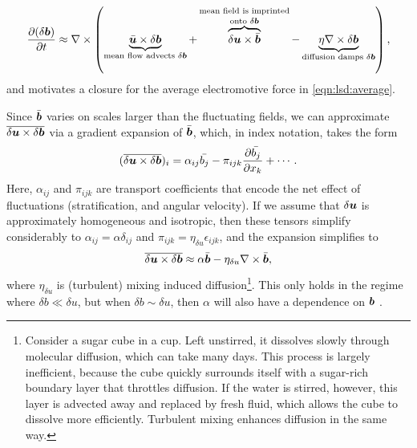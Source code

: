 \begin{align}
    \mppFrac{(\delta\mVector{b})}{t}
        \approx \mCurl{\rbrac{
            \underbrace{
                \bar{\mVector{u}}\times\delta\mVector{b}
            }_\text{mean flow advects $\delta\mVector{b}$}
            + \overbrace{
                \delta\mVector{u}\times\bar{\mVector{b}}
            }^\text{\shortstack{mean field is imprinted\\ onto $\delta\mVector{b}$}}
            - \underbrace{
                \eta \mCurl{\delta\mVector{b}}
            }_\text{diffusion damps $\delta\mVector{b}$}
        }}
    , \label{eqn:lsd:delta:reduced}
\end{align}
and motivates a closure for the average electromotive force in \autoref{eqn:lsd:average}.

Since $\bar{\bm{b}}$ varies on scales larger than the fluctuating fields, we can approximate $\overline{\delta\bm{u} \times \delta\bm{b}}$ via a gradient expansion of $\bar{\bm{b}}$, which, in index notation, takes the form
\begin{align}
    (\overline{\delta\bm{u} \times \delta\bm{b}})_{i}
        = \alpha_{ij} \bar{b_j} - \pi_{ijk} \frac{\partial \bar{b_j}}{\partial x_k} + \cdots
    .
\end{align}
Here, $\alpha_{ij}$ and $\pi_{ijk}$ are transport coefficients that encode the net effect of fluctuations (\eg stratification, and angular velocity). If we assume that $\delta\bm{u}$ is approximately homogeneous and isotropic, then these tensors simplify considerably to $\alpha_{ij} = \alpha \delta_{ij}$ and $\pi_{ijk} = \eta_{\delta u} \epsilon_{ijk}$, and the expansion simplifies to
\begin{align}
    \overline{\delta\bm{u} \times \delta\bm{b}}
        \approx \alpha \bar{\bm{b}} - \eta_{\delta u} \nabla \times \bar{\bm{b}}
    ,
\end{align}
where $\eta_{\delta u}$ is (turbulent) mixing induced diffusion\footnote{
    Consider a sugar cube in a cup. Left unstirred, it dissolves slowly through molecular diffusion, which can take many days. This process is largely inefficient, because the cube quickly surrounds itself with a sugar-rich boundary layer that throttles diffusion. If the water is stirred, however, this layer is advected away and replaced by fresh fluid, which allows the cube to dissolve more efficiently. Turbulent mixing enhances diffusion in the same way.
}. This only holds in the regime where $\delta b \ll \delta u$, but when $\delta b \sim \delta u$, then $\alpha$ will also have a dependence on $\bm{b}$ \citep[see \eg][]{cattaneo1996nonlinear}.

